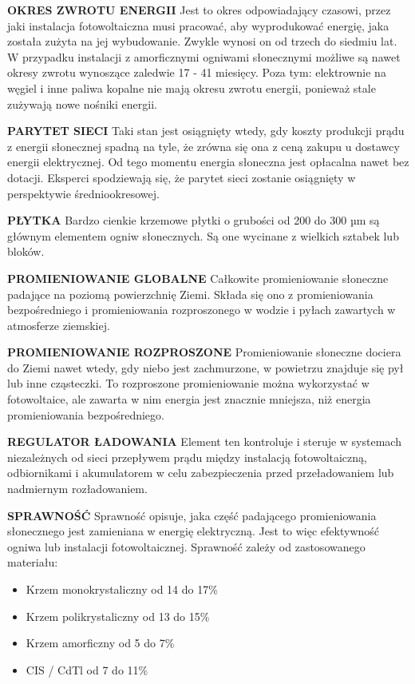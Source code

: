 \documentclass[12pt,a4paper]{article}
\begin{document}
\textbf{OKRES ZWROTU ENERGII}
Jest to okres odpowiadający czasowi, przez jaki instalacja fotowoltaiczna musi pracować, aby wyprodukować energię, jaka została zużyta na jej wybudowanie. Zwykle wynosi on od trzech do siedmiu lat. W przypadku instalacji z amorficznymi ogniwami słonecznymi możliwe są nawet okresy zwrotu wynoszące zaledwie 17 - 41 miesięcy. Poza tym: elektrownie na węgiel i inne paliwa kopalne nie mają okresu zwrotu energii, ponieważ stale zużywają nowe nośniki energii.


\textbf{PARYTET SIECI}
Taki stan jest osiągnięty wtedy, gdy koszty produkcji prądu z energii słonecznej spadną na tyle, że zrówna się ona z ceną zakupu u dostawcy energii elektrycznej. Od tego momentu energia słoneczna jest opłacalna nawet bez dotacji. Eksperci spodziewają się, że parytet sieci zostanie osiągnięty w perspektywie średniookresowej.


\textbf{PŁYTKA}
Bardzo cienkie krzemowe płytki o grubości od 200 do 300 µm są głównym elementem ogniw słonecznych. Są one wycinane z wielkich sztabek lub bloków.


\textbf{PROMIENIOWANIE GLOBALNE}
Całkowite promieniowanie słoneczne padające na poziomą powierzchnię Ziemi. Składa się ono z promieniowania bezpośredniego i promieniowania rozproszonego w wodzie i pyłach zawartych w atmosferze ziemskiej.


\textbf{PROMIENIOWANIE ROZPROSZONE}
Promieniowanie słoneczne dociera do Ziemi nawet wtedy, gdy niebo jest zachmurzone, w powietrzu znajduje się pył lub inne cząsteczki. To rozproszone promieniowanie można wykorzystać w fotowoltaice, ale zawarta w nim energia jest znacznie mniejsza, niż energia promieniowania bezpośredniego.


\textbf{REGULATOR ŁADOWANIA}
Element ten kontroluje i steruje w systemach niezależnych od sieci przepływem prądu między instalacją fotowoltaiczną, odbiornikami i akumulatorem w celu zabezpieczenia przed przeładowaniem lub nadmiernym rozładowaniem.


\textbf{SPRAWNOŚĆ}
Sprawność opisuje, jaka część padającego promieniowania słonecznego jest zamieniana w energię elektryczną. Jest to więc efektywność ogniwa lub instalacji fotowoltaicznej. Sprawność zależy od zastosowanego materiału:
\begin{itemize}
\item Krzem monokrystaliczny	od 14 do 17\%
\item Krzem polikrystaliczny	od 13 do 15\%
\item Krzem amorficzny	od 5 do 7\%
\item CIS / CdTl	od 7 do 11\%
\end{itemize}
\end{document}

